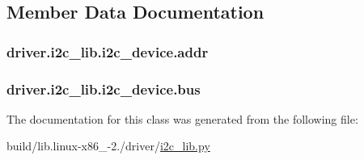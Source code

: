 \subsection{Member Data Documentation}
\hypertarget{classdriver_1_1i2c__lib_1_1i2c__device_a9cfbff86867d526e3bcb5213d80b6f2c}{}
\subsubsection[{addr}]{\setlength{\rightskip}{0pt plus 5cm}driver.\+i2c\+\_\+lib.\+i2c\+\_\+device.\+addr}\label{classdriver_1_1i2c__lib_1_1i2c__device_a9cfbff86867d526e3bcb5213d80b6f2c}
\hypertarget{classdriver_1_1i2c__lib_1_1i2c__device_ac57614bbc2affcaf48f890e8a79c1e96}{}
\subsubsection[{bus}]{\setlength{\rightskip}{0pt plus 5cm}driver.\+i2c\+\_\+lib.\+i2c\+\_\+device.\+bus}\label{classdriver_1_1i2c__lib_1_1i2c__device_ac57614bbc2affcaf48f890e8a79c1e96}


The documentation for this class was generated from the following file\+:\begin{DoxyCompactItemize}
\item 
build/lib.\+linux-\/x86\+\_-\/2./driver/\hyperlink{build_2lib_8linux-x86__64-2_87_2driver_2i2c__lib_8py}{i2c\+\_\+lib.\+py}\end{DoxyCompactItemize}
